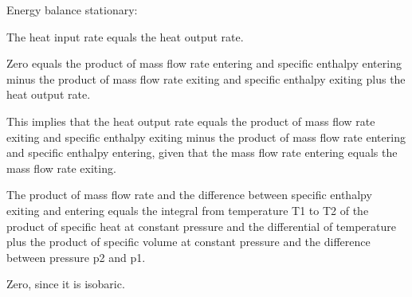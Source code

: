 Energy balance stationary:

The heat input rate equals the heat output rate.

Zero equals the product of mass flow rate entering and specific enthalpy entering minus the product of mass flow rate exiting and specific enthalpy exiting plus the heat output rate.

This implies that the heat output rate equals the product of mass flow rate exiting and specific enthalpy exiting minus the product of mass flow rate entering and specific enthalpy entering, given that the mass flow rate entering equals the mass flow rate exiting.

The product of mass flow rate and the difference between specific enthalpy exiting and entering equals the integral from temperature T1 to T2 of the product of specific heat at constant pressure and the differential of temperature plus the product of specific volume at constant pressure and the difference between pressure p2 and p1.

Zero, since it is isobaric.